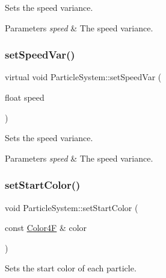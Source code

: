 Sets the speed variance.


\begin{DoxyParams}{Parameters}
{\em speed} & The speed variance. \\
\hline
\end{DoxyParams}
\mbox{\label{classParticleSystem_a9963b2a3f27a63fa0b2d6584bbf2f154}} 
\subsubsection{\texorpdfstring{set\+Speed\+Var()}{setSpeedVar()}\hspace{0.1cm}{\footnotesize\ttfamily [2/2]}}
{\footnotesize\ttfamily virtual void Particle\+System\+::set\+Speed\+Var (\begin{DoxyParamCaption}\item[{float}]{speed }\end{DoxyParamCaption})\hspace{0.3cm}{\ttfamily [virtual]}}

Sets the speed variance.


\begin{DoxyParams}{Parameters}
{\em speed} & The speed variance. \\
\hline
\end{DoxyParams}
\mbox{\label{classParticleSystem_a9a8cfdb5e2ef4a33ec198a58cfe31e19}} 
\subsubsection{\texorpdfstring{set\+Start\+Color()}{setStartColor()}\hspace{0.1cm}{\footnotesize\ttfamily [1/2]}}
{\footnotesize\ttfamily void Particle\+System\+::set\+Start\+Color (\begin{DoxyParamCaption}\item[{const \hyperlink{structColor4F}{Color4F} \&}]{color }\end{DoxyParamCaption})\hspace{0.3cm}{\ttfamily [inline]}}

Sets the start color of each particle.


